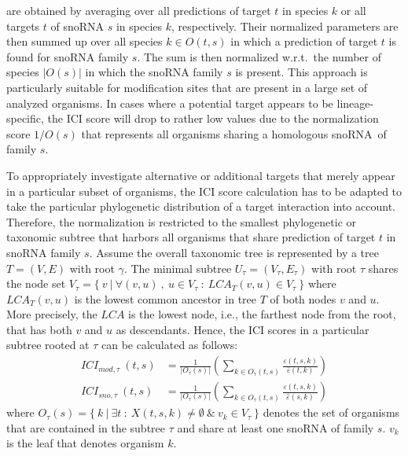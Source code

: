 \documentclass[preprint,3p,times,twocolumn]{elsarticle}
\newcommand{\sno}{snoRNA}
\begin{document}
are obtained by averaging over all predictions of target $t$ in
species $k$ or all targets $t$ of snoRNA $s$ in species $k$,
respectively.  Their normalized parameters are then summed up over all
species $k\in O(t,s)$ in which a prediction of target $t$ is found for
snoRNA family $s$. The sum is then normalized w.r.t.\ the number of
species $|O(s)|$ in which the snoRNA family $s$ is present. This
approach is particularly suitable for modification sites that are
present in a large set of analyzed organisms. In cases where a
potential target appears to be lineage-specific, the ICI score will
drop to rather low values due to the normalization score $1/O(s)$ that
represents all organisms sharing a homologous \sno\ of family $s$.

To appropriately investigate alternative or additional targets that
merely appear in a particular subset of organisms, the ICI score
calculation has to be adapted to take the particular phylogenetic
distribution of a target interaction into account. Therefore, the
normalization is restricted to the smallest phylogenetic or taxonomic
subtree that harbors all organisms that share prediction of target
$t$ in snoRNA family $s$.  Assume the overall taxonomic tree is
represented by a tree $T=(V,E)$ with root $\gamma$. The minimal
subtree $U_\tau = (V_\tau, E_\tau)$ with root $\tau$ shares the node
set
$V_\tau = \{\ v\ |\ \forall (v,u)\ ,\ u \in V_\tau\ :\ LCA_T(v,u) \in
V_\tau\ \}$ where $LCA_T(v,u)$ is the lowest common ancestor in tree
$T$ of both nodes $v$ and $u$. More precisely, the $LCA$ is the lowest
node, i.e., the farthest node from the root, that has both $v$ and $u$
as descendants.  Hence, the ICI scores in a particular subtree rooted
at $\tau$ can be calculated as follows:
\begin{equation}
  \begin{split}
    ICI_{mod,\tau}\:(t,s) & = \frac{1}{|O_\tau(s)|}  \left( \sum_{k\in O_\tau(t,s)} \frac{\varepsilon(t,s,k)}{\bar\varepsilon(t,k)} \right)
    \\
    ICI_{sno,\tau}\:(t,s) & = \frac{1}{|O_\tau(s)|}  \left( \sum_{k\in O_\tau(t,s)} \frac{\varepsilon(t,s,k)}{\hat\varepsilon(s,k)} \right)
  \end{split}
\end{equation}
where
$O_\tau(s) = \{\ k\ |\ \exists t\ :\ X(t,s,k) \ne \emptyset\ \&\ v_k
\in V_\tau\ \}$ denotes the set of organisms that are contained in the
subtree $\tau$ and share at least one snoRNA of family $s$. $v_k$ is
the leaf that denotes organism $k$.
\end{document}
